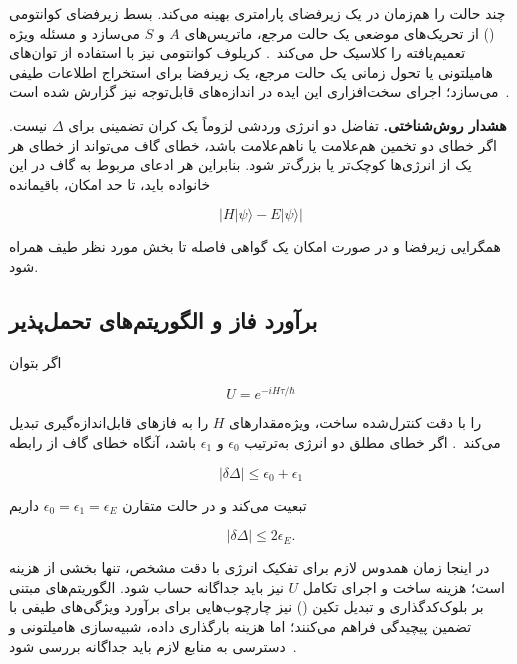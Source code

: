  چند حالت را هم‌زمان در یک زیرفضای پارامتری بهینه می‌کند.
بسط زیرفضای کوانتومی () از تحریک‌های موضعی یک حالت مرجع، ماتریس‌های $A$ و $S$ می‌سازد و مسئله ویژه تعمیم‌یافته را کلاسیک حل می‌کند~\cite{McClean2017QSE}.
کریلوف کوانتومی نیز با استفاده از توان‌های هامیلتونی یا تحول زمانی یک حالت مرجع، یک زیرفضا برای استخراج اطلاعات طیفی می‌سازد؛ اجرای سخت‌افزاری این ایده در اندازه‌های قابل‌توجه نیز گزارش شده است~\cite{KrylovNatComm2025,GapYu2025,Kirby2023Krylov}.

\textbf{هشدار روش‌شناختی.}
تفاضل دو انرژی وردشی لزوماً یک کران تضمینی برای $\Delta$ نیست.
اگر خطای دو تخمین هم‌علامت یا ناهم‌علامت باشد، خطای گاف می‌تواند از خطای هر یک از انرژی‌ها کوچک‌تر یا بزرگ‌تر شود.
بنابراین هر ادعای مربوط به گاف در این خانواده باید، تا حد امکان، باقیمانده

\begin{equation}
	|H|\psi\rangle-E|\psi\rangle|
\end{equation}

همگرایی زیرفضا و در صورت امکان یک گواهی فاصله تا بخش مورد نظر طیف همراه شود.

\subsection{برآورد فاز و الگوریتم‌های تحمل‌پذیر}

اگر بتوان

\begin{equation}
	U=e^{-iH\tau/\hbar}
\end{equation}

را با دقت کنترل‌شده ساخت،  ویژه‌مقدارهای $H$ را به فازهای قابل‌اندازه‌گیری تبدیل می‌کند~\cite{NielsenChuang2010,McArdle2020}.
اگر خطای مطلق دو انرژی به‌ترتیب $\epsilon_0$ و $\epsilon_1$ باشد، آنگاه خطای گاف از رابطه

\begin{equation}
	|\delta\Delta|
	\leq
	\epsilon_0+\epsilon_1
\end{equation}

تبعیت می‌کند و در حالت متقارن $\epsilon_0=\epsilon_1=\epsilon_E$ داریم

\begin{equation}
	|\delta\Delta|\leq2\epsilon_E.
\end{equation}

در اینجا زمان همدوس لازم برای تفکیک انرژی با دقت مشخص، تنها بخشی از هزینه است؛ هزینه ساخت و اجرای تکامل $U$ نیز باید جداگانه حساب شود.
الگوریتم‌های مبتنی بر بلوک‌کدگذاری و تبدیل تکین () نیز چارچوب‌هایی برای برآورد ویژگی‌های طیفی با تضمین پیچیدگی فراهم می‌کنند؛ اما هزینه بارگذاری داده، شبیه‌سازی هامیلتونی و دسترسی به منابع لازم باید جداگانه بررسی شود~\cite{GapCarrera2026}.

